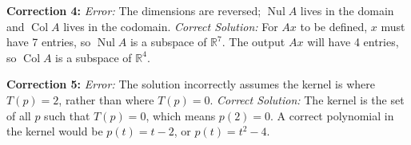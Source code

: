 \documentclass[11pt]{article}
\begin{document}
\textbf{Correction 4:} 
\textit{Error:} The dimensions are reversed; $\operatorname{Nul} A$ lives in the domain and $\operatorname{Col} A$ lives in the codomain. 
\textit{Correct Solution:} For $Ax$ to be defined, $x$ must have 7 entries, so $\operatorname{Nul} A$ is a subspace of $\mathbb{R}^7$. The output $Ax$ will have 4 entries, so $\operatorname{Col} A$ is a subspace of $\mathbb{R}^4$.

\textbf{Correction 5:} 
\textit{Error:} The solution incorrectly assumes the kernel is where $T(p) = 2$, rather than where $T(p) = 0$. 
\textit{Correct Solution:} The kernel is the set of all $p$ such that $T(p) = 0$, which means $p(2) = 0$. A correct polynomial in the kernel would be $p(t) = t - 2$, or $p(t) = t^2 - 4$.
\end{document}
